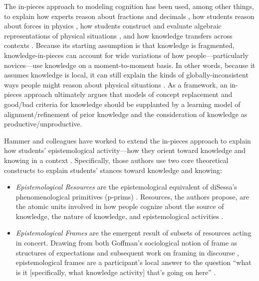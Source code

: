 The in-pieces approach to modeling cognition has been used, among other
things, to explain how experts reason about fractions and decimals \cite{smith_misconceptions_1993}, how students reason about forces in physics \cite{disessa_what_1998,disessa_epistemology_1993,hammer_misconceptions_1996,sherin_how_2001},
how students construct and evaluate algebraic representations of
physical situations \cite{izsak_we_2003,izsak_students_2004}, and how knowledge transfers across
contexts \cite{hammer_resources_2005,wagner_transfer_2006}. Because its starting
assumption is that knowledge is fragmented, knowledge-in-pieces can
account for wide variations of how people---particularly novices---use
knowledge on a moment-to-moment basis. In other words, because it
assumes knowledge is local, it can still explain the kinds of
globally-inconsistent ways people might reason about physical situations
\cite{disessa_epistemology_1993}. As a framework, an in-pieces approach ultimately argues
that models of concept replacement and good/bad criteria for knowledge
should be supplanted by a learning model of alignment/refinement of
prior knowledge and the consideration of knowledge as
productive/unproductive.

Hammer and colleagues have worked to extend the in-pieces approach to
explain how students' epistemological activity---how they orient toward
knowledge and knowing in a context \cite{hammer_resources_2005,hammer_form_2002,elby_substance_2001}. Specifically, those authors use two core theoretical
constructs to explain students' stances toward knowledge and knowing:

\begin{itemize}
\item
  \emph{Epistemological Resources} \cite{hammer_resources_2005} are the epistemological equivalent of
  diSessa's phenomenological primitives (p-prims) \cite{disessa_epistemology_1993}. Resources, the
  authors propose, are the atomic units involved in how people cognize
  about the source of knowledge, the nature of knowledge, and
  epistemological activities \cite{hammer_tapping_2003,louca_epistemological_2004}.
\item
  \emph{Epistemological Frames} are the emergent result of subsets of
  resources acting in concert. Drawing from both Goffman's
  sociological notion of frame as structures of expectations \cite{goffman_frame_1974} and
  subsequent work on framing in discourse \cite{tannen_framing_1993},
  epistemological frames are a participant's local answer to the
  question ``what is it {[}specifically, what knowledge activity{]}
  that's going on here'' \cite{goffman_frame_1974}.
\end{itemize}

